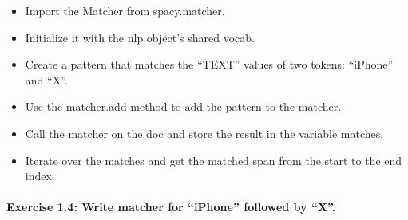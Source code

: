\documentclass[11pt]{article}
\providecommand{\tightlist}{%
      \setlength{\itemsep}{0pt}\setlength{\parskip}{0pt}}
\begin{document}
\begin{itemize}
\tightlist
\item
  Import the Matcher from spacy.matcher.
\item
  Initialize it with the nlp object's shared vocab.
\item
  Create a pattern that matches the ``TEXT'' values of two tokens:
  ``iPhone'' and ``X''.
\item
  Use the matcher.add method to add the pattern to the matcher.
\item
  Call the matcher on the doc and store the result in the variable
  matches.
\item
  Iterate over the matches and get the matched span from the start to
  the end index.
\end{itemize}

\hypertarget{exercise-1.4-write-matcher-for-iphone-followed-by-x.}{%
\paragraph{Exercise 1.4: Write matcher for ``iPhone'' followed by
``X''.}\label{exercise-1.4-write-matcher-for-iphone-followed-by-x.}}
\end{document}
